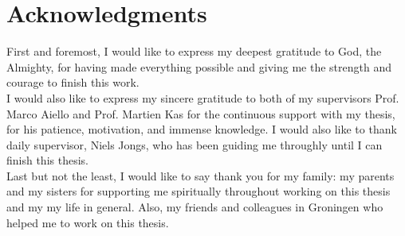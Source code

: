 
\begingroup
\let\clearpage\relax
\let\cleardoublepage\relax
\let\cleardoublepage\relax
\chapter*{Acknowledgments}
First and foremost, I would like to express my deepest gratitude to God, the Almighty, for having made everything possible and giving me the strength and courage to finish this work.\\

\noindent
I would also like to express my sincere gratitude to both of my supervisors Prof. Marco Aiello and Prof. Martien Kas for the continuous support with my thesis, for his patience, motivation, and immense knowledge. I would also like to thank daily supervisor, Niels Jongs, who has been guiding me throughly until I can finish this thesis.\\

\noindent
Last but not the least, I would like to say thank you for my family: my parents and my sisters for supporting me spiritually throughout working on this thesis and my my life in general. Also, my friends and colleagues in Groningen who helped me to work on this thesis.
\endgroup



